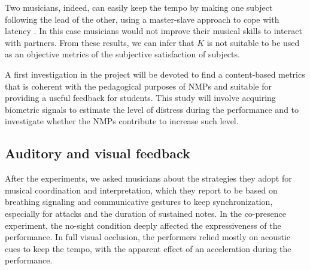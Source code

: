 Two musicians, indeed, can easily keep the tempo by making one subject following the lead of the other, using a master-slave approach to cope with latency \cite{Carot07networkmusic}. In this case musicians would not improve their musical skills to interact with partners. From these results, we can infer that $K$ is not suitable to be used as an objective metrics of the subjective satisfaction of subjects. 

A first investigation in the project will be devoted to find a content-based metrics that is coherent with the pedagogical purposes of NMPs and suitable for providing a 
useful feedback for students.%
This study will involve acquiring %
biometric signals to estimate the level of distress during the performance and to investigate whether the NMPs contribute to increase such level. 

\subsection{Auditory and visual feedback}
After the experiments, we asked musicians about the strategies they adopt for 
musical coordination and interpretation, which they report to be based on breathing signaling and communicative gestures to keep synchronization, especially for attacks and the duration of sustained notes. In the co-presence experiment, %
the no-sight condition deeply affected the expressiveness of the performance. In full visual occlusion, the performers relied mostly on acoustic cues to keep the tempo, with the apparent effect of an acceleration during the performance. 

